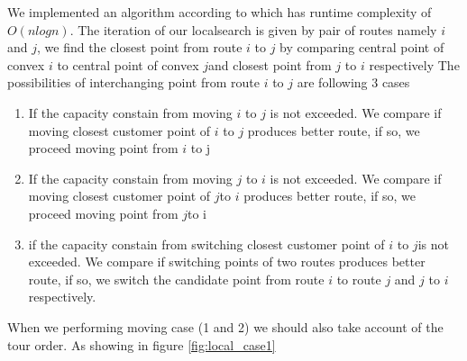\documentclass[12pt]{article}
\begin{document}
We implemented an algorithm according to \cite{Berg97} which has runtime complexity of $O(nlogn)$. The iteration of our localsearch is given by pair of routes namely \(i\) and \(j\), we find the closest point from route \(i\) to \(j\) by comparing central point of convex \(i\) to central point of convex \(j\)and closest point from \(j\) to \(i\) respectively The possibilities of interchanging point from route \(i\) to \(j\) are following 3 cases
\begin{enumerate}

	\item If the capacity constain from moving \(i\) to \(j\) is not exceeded. We compare if moving closest customer point of \(i\) to \(j\) produces better route, if so, we proceed moving point from \(i\) to j

	\item If the capacity constain from moving \(j\) to \(i\) is not exceeded. We compare if moving closest customer point of \(j\)to \(i\) produces better route, if so, we proceed moving point from \(j\)to i

	\item if the capacity constain from switching closest customer point of \(i\) to \(j\)is not exceeded. We compare if switching points of two routes produces better route, if so, we switch the candidate point from route \(i\) to route \(j\) and \(j\) to \(i\) respectively.
\end{enumerate}

When we performing moving case (1 and 2) we should also take account of the tour order. As showing in figure \ref{fig:local_case1}

\begin{figure}[!tbp]
	\centering
	\hfill


\end{figure}
\end{document}

